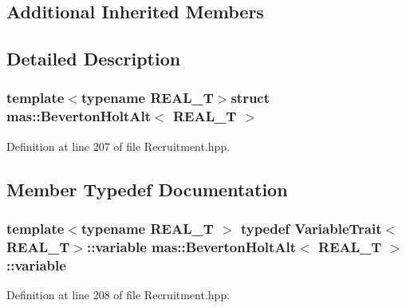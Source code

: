 \subsection*{Additional Inherited Members}


\subsection{Detailed Description}
\subsubsection*{template$<$typename R\-E\-A\-L\-\_\-\-T$>$struct mas\-::\-Beverton\-Holt\-Alt$<$ R\-E\-A\-L\-\_\-\-T $>$}



Definition at line 207 of file Recruitment.\-hpp.



\subsection{Member Typedef Documentation}
\hypertarget{structmas_1_1_beverton_holt_alt_a6d29c249aa28715df57bfe1d7e3c2709}{
\subsubsection[{variable}]{\setlength{\rightskip}{0pt plus 5cm}template$<$typename R\-E\-A\-L\-\_\-\-T $>$ typedef {\bf Variable\-Trait}$<$R\-E\-A\-L\-\_\-\-T$>$\-::{\bf variable} {\bf mas\-::\-Beverton\-Holt\-Alt}$<$ R\-E\-A\-L\-\_\-\-T $>$\-::{\bf variable}}}\label{structmas_1_1_beverton_holt_alt_a6d29c249aa28715df57bfe1d7e3c2709}


Definition at line 208 of file Recruitment.\-hpp.



